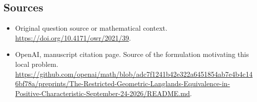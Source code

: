 \documentclass[11pt]{article}
\begin{document}
\subsection{Sources}
\begin{itemize}
\item[S1] Original question source or mathematical context.
\url{https://doi.org/10.4171/owr/2021/39}.
\item[S2] OpenAI, manuscript citation page. Source of the formulation motivating this local problem.
\url{https://github.com/openai/math/blob/adc7f1241b42e322a6451854ab7e4b4c146bf78a/preprints/The-Restricted-Geometric-Langlands-Equivalence-in-Positive-Characteristic-September-24-2026/README.md}.
\end{itemize}
\end{document}
